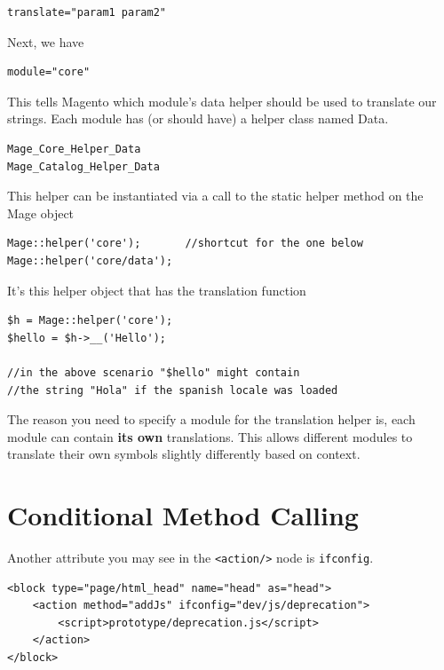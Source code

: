 \documentclass[oneside]{book}
\begin{document}
\begin{lstlisting}
translate="param1 param2"

\end{lstlisting}


Next, we have 

\begin{lstlisting}
module="core"

\end{lstlisting}


This tells Magento which module's data helper should be used to translate our strings.  Each module has (or should have) a helper class named Data.

\begin{lstlisting}
Mage_Core_Helper_Data
Mage_Catalog_Helper_Data

\end{lstlisting}


This helper can be instantiated via a call to the static helper method on the Mage object   

\begin{lstlisting}
Mage::helper('core');       //shortcut for the one below
Mage::helper('core/data');

\end{lstlisting}


It's this helper object that has the translation function

\begin{lstlisting}
$h = Mage::helper('core');
$hello = $h->__('Hello');

//in the above scenario "$hello" might contain
//the string "Hola" if the spanish locale was loaded

\end{lstlisting}


The reason you need to specify a module for the translation helper is, each module can contain \textbf{its own} translations.  This allows different modules to translate their own symbols slightly differently based on context.   

\section{Conditional Method Calling}

Another attribute you may see in the \footnotesize\texttt{\textless action/\textgreater } \normalsize  node is \footnotesize\texttt{ifconfig}\normalsize.

\begin{lstlisting}
<block type="page/html_head" name="head" as="head">
    <action method="addJs" ifconfig="dev/js/deprecation">
        <script>prototype/deprecation.js</script>
    </action>
</block>

\end{lstlisting}
\end{document}
